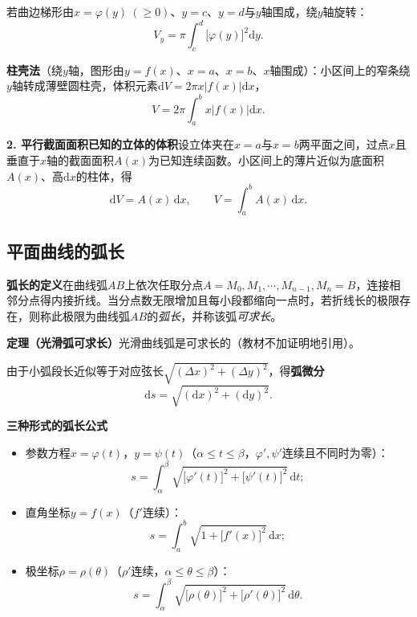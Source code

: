 \noindent 若曲边梯形由$x=\varphi(y)\ (\ge0)$、$y=c$、$y=d$与$y$轴围成，绕$y$轴旋转：
\[
V_y=\pi\int_c^d\bigl[\varphi(y)\bigr]^2\mathrm{d}y .
\]

\noindent\textbf{柱壳法}（绕$y$轴，图形由$y=f(x)$、$x=a$、$x=b$、$x$轴围成）：小区间上的窄条绕$y$轴转成薄壁圆柱壳，体积元素$\mathrm{d}V=2\pi x\bigl|f(x)\bigr|\mathrm{d}x$，
\[
V=2\pi\int_a^bx\bigl|f(x)\bigr|\mathrm{d}x .
\]

\noindent\textbf{2. 平行截面面积已知的立体的体积}\quad 设立体夹在$x=a$与$x=b$两平面之间，过点$x$且垂直于$x$轴的截面面积$A(x)$为已知连续函数。小区间上的薄片近似为底面积$A(x)$、高$\mathrm{d}x$的柱体，得
\[
\mathrm{d}V=A(x)\,\mathrm{d}x ,
\qquad
V=\int_a^bA(x)\,\mathrm{d}x .
\]



\subsection{平面曲线的弧长}

\noindent\textbf{弧长的定义}\quad 在曲线弧$AB$上依次任取分点$A=M_0,M_1,\cdots,M_{n-1},M_n=B$，连接相邻分点得内接折线。当分点数无限增加且每小段都缩向一点时，若折线长的极限存在，则称此极限为曲线弧$AB$的\emph{弧长}，并称该弧\emph{可求长}。

\noindent\textbf{定理（光滑弧可求长）}\quad 光滑曲线弧是可求长的（教材不加证明地引用）。

\noindent 由于小弧段长近似等于对应弦长$\sqrt{(\Delta x)^2+(\Delta y)^2}$，得\textbf{弧微分}
\[
\mathrm{d}s=\sqrt{(\mathrm{d}x)^2+(\mathrm{d}y)^2}.
\]

\noindent\textbf{三种形式的弧长公式}
\begin{itemize}
  \item 参数方程$x=\varphi(t)$，$y=\psi(t)$（$\alpha\le t\le\beta$，$\varphi',\psi'$连续且不同时为零）：
\[
s=\int_{\alpha}^{\beta}\sqrt{\bigl[\varphi'(t)\bigr]^2+\bigl[\psi'(t)\bigr]^2}\,\mathrm{d}t ;
\]
  \item 直角坐标$y=f(x)$（$f'$连续）：
\[
s=\int_a^b\sqrt{1+\bigl[f'(x)\bigr]^2}\,\mathrm{d}x ;
\]
  \item 极坐标$\rho=\rho(\theta)$（$\rho'$连续，$\alpha\le\theta\le\beta$）：
\[
s=\int_{\alpha}^{\beta}\sqrt{\bigl[\rho(\theta)\bigr]^2+\bigl[\rho'(\theta)\bigr]^2}\,\mathrm{d}\theta .
\]
\end{itemize}

